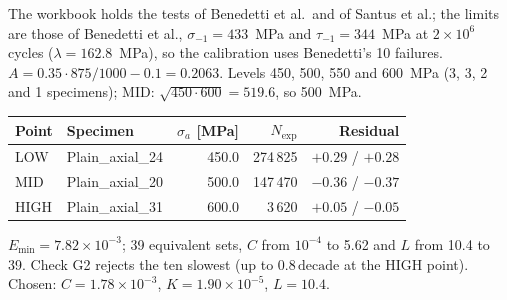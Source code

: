 \documentclass[11pt,a4paper]{article}
\newcommand{\sigm}{\sigma_{-1}}
\newcommand{\taum}{\tau_{-1}}
\newcommand{\Emin}{E_{\min}}
\newcommand{\dec}{\,\text{decade}}
\begin{document}
\begin{description}[leftmargin=0pt,font=\normalfont\bfseries]
\item[\texttt{6\_42CrMo4\_Santus.xlsx}.] The workbook holds the tests of Benedetti et al.\ and of Santus et al.; the
  limits are those of Benedetti et al., $\sigm=433$~MPa and $\taum=344$~MPa at $2\times10^6$ cycles
  ($\lambda=162.8$~MPa), so the calibration uses Benedetti's 10 failures. $A=0.35\cdot875/1000-0.1=0.2063$.
  Levels 450, 500, 550 and 600~MPa (3, 3, 2 and 1 specimens); MID: $\sqrt{450\cdot600}=519.6$, so 500~MPa.
  \begin{center}
  \begin{tabular}{@{}l l r r r@{}}
  \toprule
  Point & Specimen & $\sigma_a$ [MPa] & $N_\text{exp}$ & Residual \\
  \midrule
  LOW & Plain\_axial\_24 & 450.0 & 274\,825 & $+0.29$ / $+0.28$ \\
  MID & Plain\_axial\_20 & 500.0 & 147\,470 & $-0.36$ / $-0.37$ \\
  HIGH & Plain\_axial\_31 & 600.0 & 3\,620 & $+0.05$ / $-0.05$ \\
  \bottomrule
  \end{tabular}
  \end{center}
  $\Emin=7.82\times10^{-3}$; 39 equivalent sets, $C$ from $10^{-4}$ to 5.62 and $L$ from 10.4 to 39. Check G2
  rejects the ten slowest (up to $0.8\dec$ at the HIGH point). Chosen: $C=1.78\times10^{-3}$,
  $K=1.90\times10^{-5}$, $L=10.4$.


\end{description}
\end{document}
